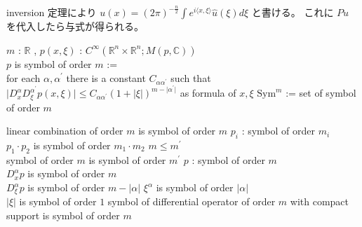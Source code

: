 \begin{Proof}
\itemprof
  inversion 定理により \(u(x) = (2\pi)^{-\frac{n}{2}} \int e^{i \langle x , \xi \rangle} \hat{u}(\xi) d \xi\) と書ける。
  これに \(P u\) を代入したら与式が得られる。
\end{Proof}

\begin{Definition}
\itemdefi
  \For \(m\) : \(\mathbb{R}\) , \(p(x,\xi)\) : \(C^\infty(\mathbb{R}^n \times \mathbb{R}^n ; M(p , \mathbb{C}))\) \\
  \Define \(p\) is symbol of order \(m\) := \\
  for each \(\alpha , \alpha^\prime\) there is a constant \(C_{\alpha \alpha^\prime}\) such that \(\lvert D^\alpha_x D^{\alpha^\prime}_\xi p(x , \xi) \rvert \leq C_{\alpha \alpha^\prime} (1 + \lvert \xi \rvert)^{m - \lvert \alpha^{\prime} \rvert}\) as formula of \(x,\xi\)
\itemdefi
  \Define \(\text{Sym}^m\) := set of symbol of order \(m\)
\end{Definition}

\begin{Theorem}
\itemprop
  \Then linear combination of order \(m\) is symbol of order \(m\)
\itemprop
  \For \(p_i\) : symbol of order \(m_i\) \\
  \Then \(p_1 \cdot p_2\) is symbol of order \(m_1 \cdot m_2\)
\itemprop
  \IfHold \(m \leq m^{\prime}\) \\
  \Then symbol of order \(m\) is symbol of order \(m^{\prime}\)
\itemprop
  \For \(p\) : symbol of order \(m\) \\
  \Then \(D^\alpha_x p\) is symbol of order \(m\) \\
  \Then \(D^\alpha_\xi p\) is symbol of order \(m - \lvert \alpha \rvert\)
\itemprop
  \Then \(\xi^\alpha\) is symbol of order \(\lvert \alpha \rvert\) \\
  \Then \(\lvert \xi \rvert\) is symbol of order \(1\)
\itemprop
  \Then symbol of differential operator of order \(m\) with compact support is symbol of order \(m\)
\end{Theorem}

